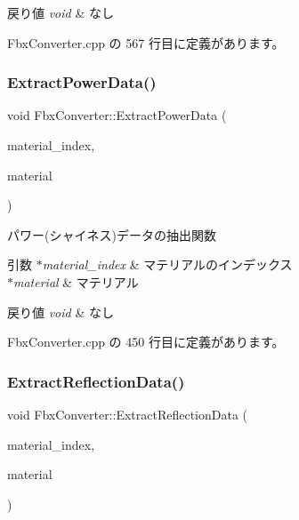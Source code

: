 \begin{DoxyRetVals}{戻り値}
{\em void} & なし \\
\hline
\end{DoxyRetVals}


 Fbx\+Converter.\+cpp の 567 行目に定義があります。

\mbox{\label{class_fbx_converter_aa2d0d302ad6691934164dfdf1f5f6590}} 
\subsubsection{\texorpdfstring{Extract\+Power\+Data()}{ExtractPowerData()}}
{\footnotesize\ttfamily void Fbx\+Converter\+::\+Extract\+Power\+Data (\begin{DoxyParamCaption}\item[{int}]{material\+\_\+index,  }\item[{Fbx\+Surface\+Material $\ast$}]{material }\end{DoxyParamCaption})\hspace{0.3cm}{\ttfamily [private]}}



パワー(シャイネス)データの抽出関数 


\begin{DoxyParams}{引数}
{\em $\ast$material\+\_\+index} & マテリアルのインデックス \\
\hline
{\em $\ast$material} & マテリアル \\
\hline
\end{DoxyParams}

\begin{DoxyRetVals}{戻り値}
{\em void} & なし \\
\hline
\end{DoxyRetVals}


 Fbx\+Converter.\+cpp の 450 行目に定義があります。

\mbox{\label{class_fbx_converter_a25d2148fb64c484684c7eb856e9ae255}} 
\subsubsection{\texorpdfstring{Extract\+Reflection\+Data()}{ExtractReflectionData()}}
{\footnotesize\ttfamily void Fbx\+Converter\+::\+Extract\+Reflection\+Data (\begin{DoxyParamCaption}\item[{int}]{material\+\_\+index,  }\item[{Fbx\+Surface\+Material $\ast$}]{material }\end{DoxyParamCaption})\hspace{0.3cm}{\ttfamily [private]}}




